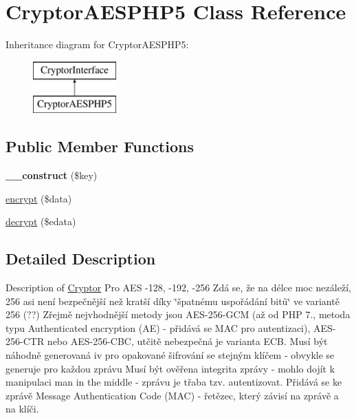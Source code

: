 \hypertarget{class_pes_1_1_security_1_1_cryptor_1_1_cryptor_a_e_s_p_h_p5}{}\section{Cryptor\+A\+E\+S\+P\+H\+P5 Class Reference}
\label{class_pes_1_1_security_1_1_cryptor_1_1_cryptor_a_e_s_p_h_p5}
Inheritance diagram for Cryptor\+A\+E\+S\+P\+H\+P5\+:\begin{figure}[H]
\begin{center}
\leavevmode
\includegraphics[height=2.000000cm]{class_pes_1_1_security_1_1_cryptor_1_1_cryptor_a_e_s_p_h_p5}
\end{center}
\end{figure}
\subsection*{Public Member Functions}
\begin{DoxyCompactItemize}
\item 
\mbox{\label{class_pes_1_1_security_1_1_cryptor_1_1_cryptor_a_e_s_p_h_p5_ae68e3281fdc4689e22a68b4b463c5fa9}} 
{\bfseries \+\_\+\+\_\+construct} (\$key)
\item 
\mbox{\hyperlink{class_pes_1_1_security_1_1_cryptor_1_1_cryptor_a_e_s_p_h_p5_a07bcc8ef1d23370470ecb5ae8fc07dfa}{encrypt}} (\$data)
\item 
\mbox{\hyperlink{class_pes_1_1_security_1_1_cryptor_1_1_cryptor_a_e_s_p_h_p5_aed69cdc691e1155856c905ee1c08d9b7}{decrypt}} (\$edata)
\end{DoxyCompactItemize}


\subsection{Detailed Description}
Description of \mbox{\hyperlink{namespace_pes_1_1_security_1_1_cryptor}{Cryptor}} Pro A\+ES -\/128, -\/192, -\/256 Zdá se, že na délce moc nezáleží, 256 asi není bezpečnější než kratší díky \char`\"{}špatnému uspořádání bitů\char`\"{} ve variantě 256 (??) Zřejmě nejvhodnější metody jsou A\+E\+S-\/256-\/\+G\+CM (až od P\+HP 7., metoda typu Authenticated encryption (AE) -\/ přidává se M\+AC pro autentizaci), A\+E\+S-\/256-\/\+C\+TR nebo A\+E\+S-\/256-\/\+C\+BC, utčitě nebezpečná je varianta E\+CB. Musí být náhodně generovaná iv pro opakované šifrování se stejným klíčem -\/ obvykle se generuje pro každou zprávu Musí být ověřena integrita zprávy -\/ mohlo dojít k manipulaci man in the middle -\/ zprávu je třaba tzv. autentizovat. Přidává se ke zprávě Message Authentication Code (M\+AC) -\/ řetězec, který závisí na zprávě a na klíči.

